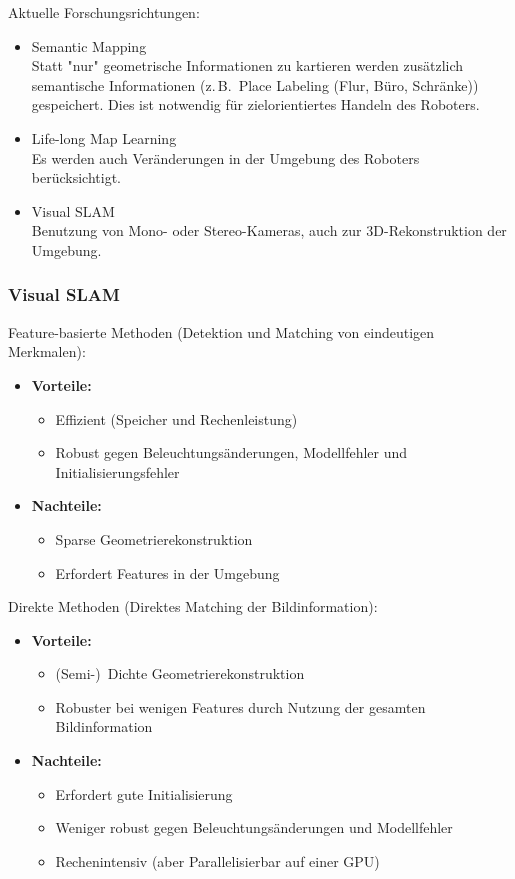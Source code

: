 \documentclass[a4paper, 11pt, accentcolor = tud3b]{tudreport}
\newcommand{\zB}{z.\,B.~}
\begin{document}
					Aktuelle Forschungsrichtungen:
					\begin{itemize}
						\item Semantic Mapping \\ Statt "nur" geometrische Informationen zu kartieren werden zusätzlich semantische Informationen (\zB Place Labeling (Flur, Büro, Schränke)) gespeichert. Dies ist notwendig für zielorientiertes Handeln des Roboters.
						\item Life-long Map Learning \\ Es werden auch Veränderungen in der Umgebung des Roboters berücksichtigt.
						\item Visual SLAM \\ Benutzung von Mono- oder Stereo-Kameras, auch zur 3D-Rekonstruktion der Umgebung.
					\end{itemize}

				\subsubsection{Visual SLAM}
					Feature-basierte Methoden (Detektion und Matching von eindeutigen Merkmalen):
					\begin{itemize}
						\item \textbf{Vorteile:}
							\begin{itemize}
								\item Effizient (Speicher und Rechenleistung)
								\item Robust gegen Beleuchtungsänderungen, Modellfehler und Initialisierungsfehler
							\end{itemize}
						\item \textbf{Nachteile:}
							\begin{itemize}
								\item Sparse Geometrierekonstruktion
								\item Erfordert Features in der Umgebung
							\end{itemize}
					\end{itemize}
					
					Direkte Methoden (Direktes Matching der Bildinformation):
					\begin{itemize}
						\item \textbf{Vorteile:}
							\begin{itemize}
								\item (Semi-)~Dichte Geometrierekonstruktion
								\item Robuster bei wenigen Features durch Nutzung der gesamten Bildinformation
							\end{itemize}
						\item \textbf{Nachteile:}
							\begin{itemize}
								\item Erfordert gute Initialisierung
								\item Weniger robust gegen Beleuchtungsänderungen und Modellfehler
								\item Rechenintensiv (aber Parallelisierbar auf einer GPU)
							\end{itemize}
					\end{itemize}
\end{document}
